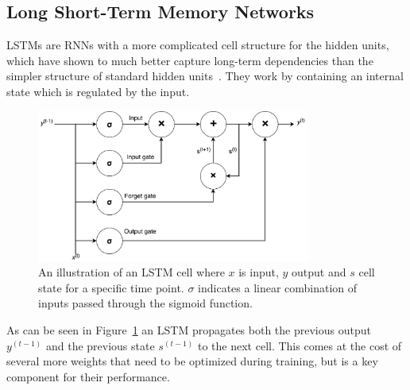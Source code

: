 \subsection{Long Short-Term Memory Networks}
LSTMs are RNNs with a more complicated cell structure for the hidden units, which have shown to much better capture long-term dependencies than the simpler structure of standard hidden units~\cite{hochreiter1997long}. They work by containing an internal state which is regulated by the input.

\begin{figure}[H]
  \centering
  \includegraphics[width=0.8\textwidth]{graphics/lstm-cell}
  \caption{An illustration of an LSTM cell where $x$ is input, $y$ output and $s$ cell state for a specific time point. $\sigma$ indicates a linear combination of inputs passed through the sigmoid function. }\label{fig:lstm-cell}
\end{figure}
As can be seen in Figure~\ref{fig:lstm-cell} an LSTM propagates both the previous output $y^{(t-1)}$ and the previous state $s^{(t-1)}$ to the next cell. This comes at the cost of several more weights that need to be optimized during training, but is a key component for their performance.